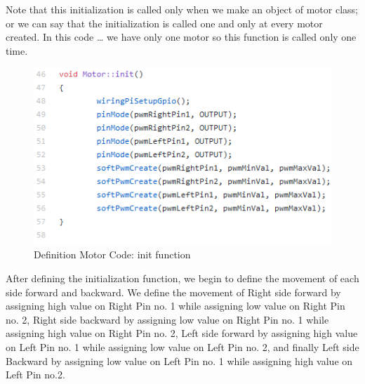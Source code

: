 \documentclass{article}
\begin{document}
\newpage

Note that this initialization is called only when we make an object of motor class; or we can say that the initialization is called one and only at every motor created.  In this code … we have only one motor so this function is called only one time.

\begin{figure}[h]
    \centering
    \includegraphics{figures/62.png}
    \caption{Definition Motor Code: init function}
    \label{fig:my_label}
\end{figure}

\newpage
After defining the initialization function, we begin to define the movement of each side forward and backward. We define the movement of Right side forward by assigning high value on Right Pin no. 1 while assigning low value on Right Pin no. 2, Right side backward by assigning low value on Right Pin no. 1 while assigning high value on Right Pin no. 2, Left side forward by assigning high value on Left Pin no. 1 while assigning low value on Left Pin no. 2, and finally Left side Backward by assigning low value on Left Pin no. 1 while assigning high value on Left Pin no.2.
\end{document}
